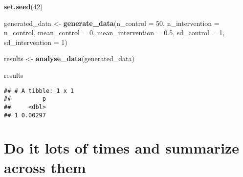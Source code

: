 \documentclass[
]{article}
\newenvironment{Shaded}{\begin{snugshade}}{\end{snugshade}}
\newcommand{\AttributeTok}[1]{\textcolor[rgb]{0.13,0.29,0.53}{#1}}
\newcommand{\DecValTok}[1]{\textcolor[rgb]{0.00,0.00,0.81}{#1}}
\newcommand{\FloatTok}[1]{\textcolor[rgb]{0.00,0.00,0.81}{#1}}
\newcommand{\FunctionTok}[1]{\textcolor[rgb]{0.13,0.29,0.53}{\textbf{#1}}}
\newcommand{\NormalTok}[1]{#1}
\newcommand{\OtherTok}[1]{\textcolor[rgb]{0.56,0.35,0.01}{#1}}
\begin{document}
\begin{Shaded}
\begin{Highlighting}[]
\FunctionTok{set.seed}\NormalTok{(}\DecValTok{42}\NormalTok{)}

\NormalTok{generated\_data }\OtherTok{\textless{}{-}} \FunctionTok{generate\_data}\NormalTok{(}\AttributeTok{n\_control =} \DecValTok{50}\NormalTok{,}
                                \AttributeTok{n\_intervention =}\NormalTok{ n\_control,}
                                \AttributeTok{mean\_control =} \DecValTok{0}\NormalTok{,}
                                \AttributeTok{mean\_intervention =} \FloatTok{0.5}\NormalTok{,}
                                \AttributeTok{sd\_control =} \DecValTok{1}\NormalTok{,}
                                \AttributeTok{sd\_intervention =} \DecValTok{1}\NormalTok{)}

\NormalTok{results }\OtherTok{\textless{}{-}} \FunctionTok{analyse\_data}\NormalTok{(generated\_data)}

\NormalTok{results}
\end{Highlighting}
\end{Shaded}

\begin{verbatim}
## # A tibble: 1 x 1
##         p
##     <dbl>
## 1 0.00297
\end{verbatim}

\hypertarget{do-it-lots-of-times-and-summarize-across-them}{%
\section{Do it lots of times and summarize across
them}\label{do-it-lots-of-times-and-summarize-across-them}}
\end{document}
